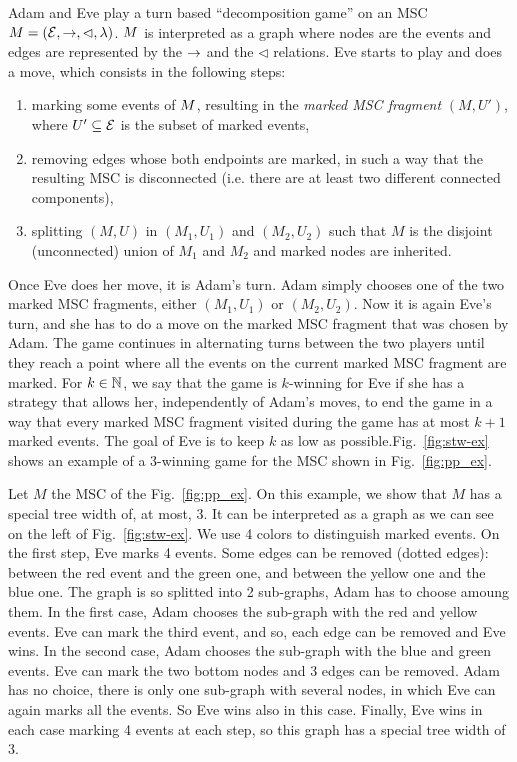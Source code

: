 Adam and Eve play a turn based ``decomposition game'' on an MSC $M = (\mathcal{E}, \to, \lhd, \lambda)$. $M$ is interpreted as a graph where nodes are the events and edges are represented by the $\to$ and the $\lhd$ relations.
Eve starts to play and does a move, which consists in the following steps:
\begin{enumerate}
	\item marking some events of $M$, resulting in the \emph{marked MSC fragment} $(M, U')$, where $U' \subseteq \mathcal{E}$ is the subset of marked events,
	\item removing edges whose both endpoints are marked, in such a way that the resulting MSC is disconnected (i.e. there are at least two different connected components),
	\item splitting $(M, U)$ in $(M_1, U_1)$ and $(M_2, U_2)$ such that $M$ is the disjoint (unconnected) union of $M_1$ and $M_2$
	and marked nodes are inherited.
\end{enumerate}
Once Eve does her move, it is Adam's turn. Adam simply chooses one of the two marked MSC fragments, either $(M_1, U_1)$ or $(M_2, U_2)$. Now it is again Eve's turn, and she has to do a move on the marked MSC fragment that was chosen by Adam. The game continues in alternating turns between the two players until they reach a point where all the events on the current marked MSC fragment are marked.
For $k \in \mathbb{N}$, we say that the game is $k$-winning for Eve if she has a strategy that allows her, independently of Adam's moves, to end the game in a way that every marked MSC fragment visited during the game has at most $k+1$ marked events. The goal of Eve is to keep $k$ as low as possible.Fig.~\ref{fig:stw-ex} shows an example of a 3-winning game for the MSC shown in Fig.~\ref{fig:pp_ex}.

\begin{example}
	Let $M$ the MSC of the Fig.~\ref{fig:pp_ex}. On this example, we show that $M$ has a special tree width of, at most, 3. It can be interpreted as a graph as we can see on the left of Fig.~\ref{fig:stw-ex}.  We use 4 colors to distinguish marked events. On the first step, Eve marks 4 events. Some edges can be removed (dotted edges): between the red event and the green one, and between the yellow one and the blue one. The graph is so splitted into 2 sub-graphs, Adam has to choose amoung them.
	In the first case, Adam chooses the sub-graph with the red and yellow events. Eve can mark the third event, and so, each edge can be removed and Eve wins.
	In the second case, Adam chooses the sub-graph with the blue and green events. Eve can mark the two bottom nodes and 3 edges can be removed.
	Adam has no choice, there is only one sub-graph with several nodes, in which Eve can again marks all the events. So Eve wins also in this case.
	Finally, Eve wins in each case marking 4 events at each step, so this graph has a special tree width of 3.
\end{example}


